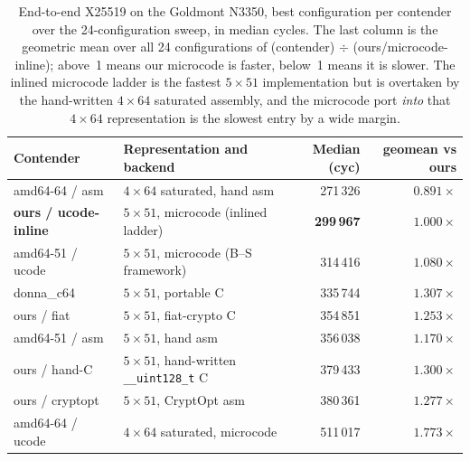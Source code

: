 \begin{table}[t]
\centering
\caption{End-to-end X25519 on the Goldmont N3350, best configuration per contender
over the 24-configuration sweep, in median cycles. The last column is the
geometric mean over all 24 configurations of (contender) $\div$
(ours/microcode-inline); above~1 means our microcode is faster, below~1 means it
is slower. The inlined microcode ladder is the fastest $5\times51$ implementation
but is overtaken by the hand-written $4\times64$ saturated assembly, and the
microcode port \emph{into} that $4\times64$ representation is the slowest entry by
a wide margin.}
\label{tab:results-curve-e2e}
\small
\begin{tabular}{@{}llrr@{}}
\toprule
Contender & Representation and backend & Median (cyc) & geomean vs ours \\
\midrule
amd64-64 / asm       & $4\times64$ saturated, hand asm             & 271\,326 & $0.891\times$ \\
\textbf{ours / ucode-inline} & $5\times51$, microcode (inlined ladder) & \textbf{299\,967} & $1.000\times$ \\
amd64-51 / ucode     & $5\times51$, microcode (B--S framework)     & 314\,416 & $1.080\times$ \\
donna\_c64           & $5\times51$, portable C                     & 335\,744 & $1.307\times$ \\
ours / fiat          & $5\times51$, fiat-crypto C                  & 354\,851 & $1.253\times$ \\
amd64-51 / asm       & $5\times51$, hand asm                       & 356\,038 & $1.170\times$ \\
ours / hand-C        & $5\times51$, hand-written \texttt{\_\_uint128\_t} C & 379\,433 & $1.300\times$ \\
ours / cryptopt      & $5\times51$, CryptOpt asm                   & 380\,361 & $1.277\times$ \\
amd64-64 / ucode     & $4\times64$ saturated, microcode            & 511\,017 & $1.773\times$ \\
\bottomrule
\end{tabular}
\end{table}


